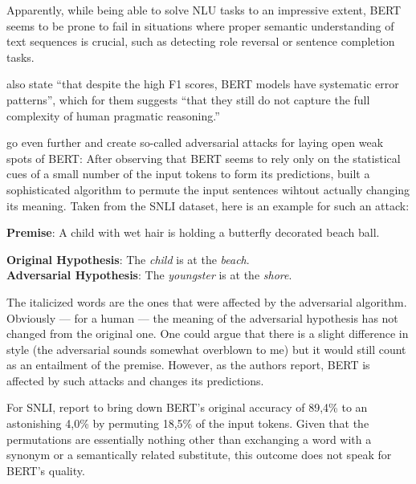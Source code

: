 Apparently, while being able to solve NLU tasks to an impressive extent, BERT seems to be prone
to fail in situations where proper semantic understanding of text sequences is crucial, such as
detecting role reversal or sentence completion tasks.

\cite{jiang2019evaluating} also state ``that despite the high F1 scores, BERT models have
systematic error patterns'', which for them suggests ``that they still do not capture the
full complexity of human pragmatic reasoning.''

\cite{jin2020bert} go even further and create so-called adversarial attacks for laying open
weak spots of BERT: After observing that BERT seems to rely only on the statistical cues of
a small number of the input tokens to form its predictions, \citeauthor{jin2020bert} built a
sophisticated algorithm to permute the input sentences wihtout actually changing its meaning.
Taken from the SNLI \citep{bowman2015snli} dataset, here is an example for such an attack:

\begin{examples}
  \item \textbf{Premise}: A child with wet hair is holding a butterfly decorated beach ball.

        \textbf{Original Hypothesis}: The \emph{child} is at the \emph{beach}.\\
        \textbf{Adversarial Hypothesis}: The \emph{youngster} is at the \emph{shore}.
\end{examples}

The italicized words are the ones that were affected by the adversarial algorithm.
Obviously --- for a human --- the meaning of the adversarial hypothesis has not
changed from the original one. One could argue that there is a slight difference
in style (the adversarial sounds somewhat overblown to me) but it would still count
as an entailment of the premise. However, as the authors report, BERT is affected
by such attacks and changes its predictions.

For SNLI, \citeauthor{jin2020bert} report to bring down BERT's original accuracy of 89,4\%
to an astonishing 4,0\% by permuting 18,5\% of the input tokens. Given that the permutations
are essentially nothing other than exchanging a word with a synonym or a semantically related
substitute, this outcome does not speak for BERT's quality.




